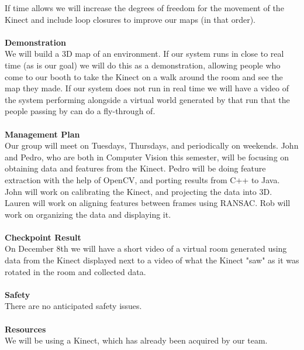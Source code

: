 \documentclass[12pt]{article}
\begin{document}
If time allows we will increase the degrees of freedom for the movement of the Kinect  and include
loop closures to improve our maps (in that order).
\\ \\
{\bf Demonstration }\\
We will build a 3D map of an environment.  If our system runs in close to real time (as is our goal) 
we will do this as a demonstration, allowing people who come to our booth to take the Kinect on a 
walk around the room and see the map they made.  If our system does not run in real time we will 
have a video of the system performing alongside a virtual world generated by that run that the people
passing by can do a fly-through of.
\\ \\
{\bf Management Plan }\\
Our group will meet on Tuesdays, Thursdays, and periodically on weekends.  John and Pedro, 
who are both in Computer Vision this semester, will be focusing on obtaining data and features 
from the Kinect.  Pedro will be doing feature extraction with the help of OpenCV, and porting 
results from C++ to Java.  John will work on calibrating the Kinect, and projecting the data into
3D.  Lauren will work on aligning features between frames using RANSAC.  Rob will work on 
organizing the data and displaying it.
\\ \\
{\bf Checkpoint Result }\\
On December 8th we will have a short video of a virtual room generated using data from the Kinect
displayed next to a video of what the Kinect "saw" as it was rotated in the room and collected data.
\\ \\
{\bf Safety }\\
There are no anticipated safety issues.
\\ \\
{\bf Resources }\\
We will be using a Kinect, which has already been acquired by our team.
\end{document}
